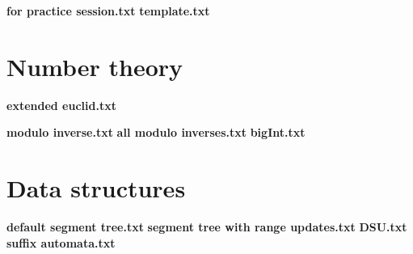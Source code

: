 \documentclass[a4paper]{article}
\newcommand{\AddSection}[1]{\textbf{#1} }
\begin{document}
\AddSection{for practice session.txt}
\AddSection{template.txt}

\section{Number theory} 

\AddSection{extended euclid.txt}

\AddSection{modulo inverse.txt}
\AddSection{all modulo inverses.txt}
\AddSection{bigInt.txt}

\section{Data structures}

\AddSection{default segment tree.txt}
\AddSection{segment tree with range updates.txt}
\AddSection{DSU.txt}
\AddSection{suffix automata.txt}
\end{document}

